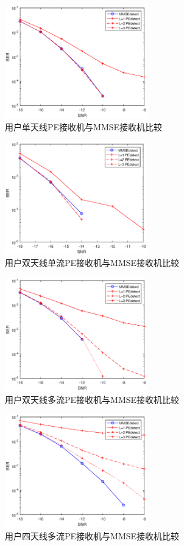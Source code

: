 \documentclass[bachelor,nocolorlinks, printoneside]{seuthesis} %
\begin{document}
\begin{Main}
\begin{figure}[htbp!]
	\centering \includegraphics[width=0.55\textwidth]{img/4_1.eps} \caption{用户单天线PE接收机与MMSE接收机比较}
\end{figure}
\begin{figure}[htbp!]
	\centering \includegraphics[width=0.55\textwidth]{img/4_2.eps} \caption{用户双天线单流PE接收机与MMSE接收机比较}
\end{figure}
\begin{figure}[htbp!]
	\centering \includegraphics[width=0.55\textwidth]{img/4_3.eps} \caption{用户双天线多流PE接收机与MMSE接收机比较}
\end{figure}
\begin{figure}[htbp!]
	\centering \includegraphics[width=0.55\textwidth]{img/4_4.eps} \caption{用户四天线多流PE接收机与MMSE接收机比较}
\end{figure}

\end{Main}
\end{document}
